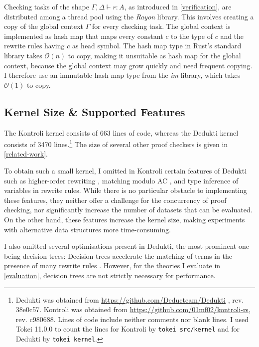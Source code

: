\documentclass[screen,sigplan,10pt]{acmart}
\begin{document}
Checking tasks of the shape \(\Gamma, \Delta \vdash r: A\), as
introduced in \autoref{verification}, are distributed among a thread
pool using the \emph{Rayon} library. This involves creating a copy of
the global context \(\Gamma\) for every checking task. The global
context is implemented as hash map that maps every constant \(c\) to the
type of \(c\) and the rewrite rules having \(c\) as head symbol. The
hash map type in Rust's standard library takes \(\mathcal{O}(n)\) to
copy, making it unsuitable as hash map for the global context, because
the global context may grow quickly and need frequent copying. I
therefore use an immutable hash map type from the \emph{im} library,
which takes \(\mathcal{O}(1)\) to copy.

\hypertarget{kernel-size-supported-features}{%
\subsection{Kernel Size \& Supported
Features}\label{kernel-size-supported-features}}

The Kontroli kernel consists of 663 lines of code, whereas the Dedukti
kernel consists of 3470 lines.\footnote{Dedukti was obtained from
  \url{https://github.com/Deducteam/Dedukti} , rev. 38e0c57. Kontroli
  was obtained from \url{https://github.com/01mf02/kontroli-rs}, rev.
  c980688. Lines of code include neither comments nor blank lines. I
  used Tokei 11.0.0 to count the lines for Kontroli by
  \texttt{tokei\ src/kernel} and for Dedukti by \texttt{tokei\ kernel}.}
The size of several other proof checkers is given in
\autoref{related-work}.

To obtain such a small kernel, I omitted in Kontroli certain features of
Dedukti such as higher-order rewriting
\citep{DBLP:journals/logcom/Miller91}, matching modulo AC
\citep{DBLP:conf/rta/Contejean04}, and type inference of variables in
rewrite rules. While there is no particular obstacle to implementing
these features, they neither offer a challenge for the concurrency of
proof checking, nor significantly increase the number of datasets that
can be evaluated. On the other hand, these features increase the kernel
size, making experiments with alternative data structures more
time-consuming.

I also omitted several optimisations present in Dedukti, the most
prominent one being decision trees: Decision trees accelerate the
matching of terms in the presence of many rewrite rules
\citep{DBLP:conf/fscd/HondetB20}. However, for the theories I evaluate
in \autoref{evaluation}, decision trees are not strictly necessary for
performance.
\end{document}
